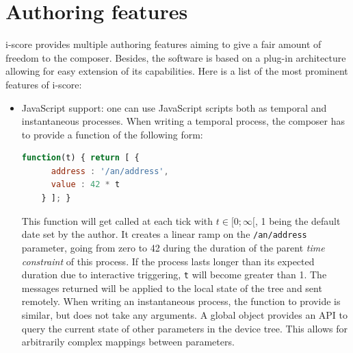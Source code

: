 \documentclass{article}
\newcommand{\timeconstraint}{\textit{time constraint}\xspace}
\begin{document}
\section{Authoring features}
i-score provides multiple authoring features aiming to give a fair amount of freedom to the composer.
Besides, the software is based on a plug-in architecture allowing for easy extension of its capabilities.
Here is a list of the most prominent features of i-score: 
\begin{itemize}
\item JavaScript support: one can use JavaScript scripts both as temporal and instantaneous processes.
When writing a temporal process, the composer has to provide a function of the following form: 
\begin{lstlisting}[language=JavaScript]
function(t) { return [ {
      address : '/an/address',
      value : 42 * t
    } ]; }
\end{lstlisting}
This function will get called at each tick with $t \in [0; \infty[$, 1 being the default date set by the author.
It creates a linear ramp on the \lstinline|/an/address| parameter, going from zero to 42 during the duration of the parent \timeconstraint of this process.
If the process lasts longer than its expected duration due to interactive triggering, \lstinline|t| will become greater than 1.
The messages returned will be applied to the local state of the tree and sent remotely.
When writing an instantaneous process, the function to provide is similar, but does not take any arguments.
A global object provides an API to query the current state of other parameters in the device tree.
This allows for arbitrarily complex mappings between parameters.


\end{itemize}
\end{document}
